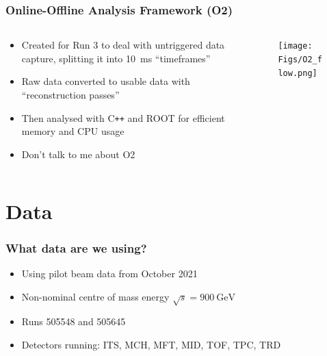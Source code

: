 \documentclass[11pt]{beamer}
\begin{document}
\begin{frame}
    \frametitle{Online-Offline Analysis Framework (O2)}

    \begin{columns}[c]
        \begin{column}{0.5\textwidth}
            \begin{itemize}
                \item Created for Run 3 to deal with untriggered data capture, splitting it into \SI{10}{\milli\second} ``timeframes''
                \item Raw data converted to usable data with ``reconstruction passes''
                \item Then analysed with C\texttt{++} and ROOT for efficient memory and CPU usage
                \item Don't talk to me about O2
            \end{itemize}
        \end{column}

        \begin{column}{0.5\textwidth}
            \begin{figure}
                \begin{center}
                    \texttt{[image: Figs/O2\_flow.png]}
                \end{center}
            \end{figure}
        \end{column}
    \end{columns}

\end{frame}

\section{Data}

\begin{frame}
    \frametitle{What data are we using?}

    \begin{itemize}
        \item Using pilot beam data from October 2021
        \item Non-nominal centre of mass energy $\sqrt{s}=\SI{900}{\giga\electronvolt}$
        \item Runs 505548 and 505645
        \item Detectors running: ITS, MCH, MFT, MID, TOF, TPC, TRD
    \end{itemize}

\end{frame}
\end{document}

